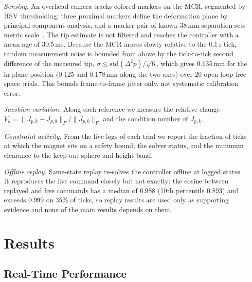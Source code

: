 \documentclass[journal]{IEEEtran}
\begin{document}
\emph{Sensing.} An overhead camera tracks colored markers on the MCR,
segmented by HSV thresholding; three proximal markers define the
deformation plane by principal component analysis, and a marker pair of
known 38\,mm separation sets metric scale~\cite{shi2017shape}. The tip
estimate is not filtered and reaches the controller with a mean age of
30.5\,ms. Because the MCR moves slowly relative to the 0.1\,s tick,
random measurement noise is bounded from above by the tick-to-tick second
difference of the measured tip, $\sigma\le\mathrm{std}(\Delta^2p)/\sqrt6$,
which gives 0.135\,mm for the in-plane position (0.125 and 0.178\,mm
along the two axes) over 20 open-loop free-space trials. This bounds
frame-to-frame jitter only, not systematic calibration error.

\emph{Jacobian variation.} Along each reference we measure the relative
change $V_k=\lVert J_{p,k}-J_{p,0}\rVert_F/\lVert J_{p,0}\rVert_F$ and the
condition number of $J_{p,k}$.

\emph{Constraint activity.} From the live logs of each trial we report
the fraction of ticks at which the magnet sits on a safety bound, the
solver status, and the minimum clearance to the keep-out sphere and
height band.

\emph{Offline replay.} Same-state replay re-solves the controller offline
at logged states. It reproduces the live command closely but not
exactly: the cosine between replayed and live commands has a median of
0.988 (10th percentile 0.893) and exceeds 0.999 on 35\% of ticks, so
replay results are used only as supporting evidence and none of the main
results depends on them.

\section{Results}
\label{sec:results}

\subsection{Real-Time Performance}
\label{sec:res-time}
\end{document}
